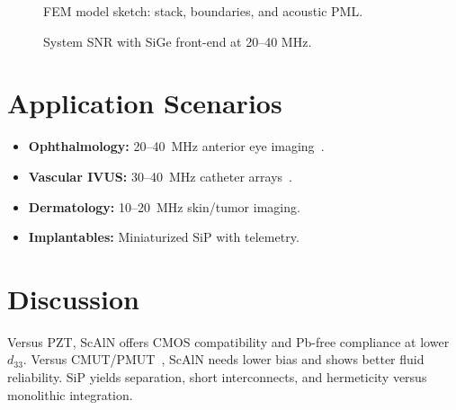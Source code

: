 \documentclass[conference]{IEEEtran}
\begin{document}
\begin{figure}[!t]
\centering
{}
\caption{FEM model sketch: stack, boundaries, and acoustic PML.}
\label{fig:mode}
\end{figure}

\begin{figure}[!t]
\centering
{}
\caption{System SNR with SiGe front-end at 20--40 MHz.}
\label{fig:snr}
\end{figure}

\section{Application Scenarios}
\begin{itemize}
  \item \textbf{Ophthalmology:} 20--40~MHz anterior eye imaging~\cite{pavlin2009ubm}.
  \item \textbf{Vascular IVUS:} 30--40~MHz catheter arrays~\cite{foster2000ivus}.
  \item \textbf{Dermatology:} 10--20~MHz skin/tumor imaging.
  \item \textbf{Implantables:} Miniaturized SiP with telemetry.
\end{itemize}

\section{Discussion}
Versus PZT, ScAlN offers CMOS compatibility and Pb-free compliance at lower $d_{33}$. Versus CMUT/PMUT~\cite{khuri2009cmut}, ScAlN needs lower bias and shows better fluid reliability. SiP yields separation, short interconnects, and hermeticity versus monolithic integration.
\end{document}

